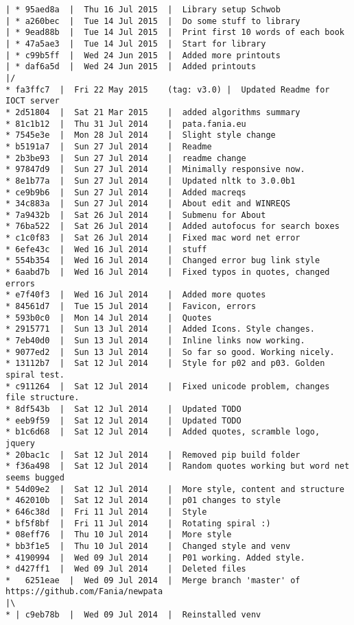 \begin{verbatim}
| * 95aed8a  |  Thu 16 Jul 2015	 |  Library setup Schwob
| * a260bec  |  Tue 14 Jul 2015	 |  Do some stuff to library
| * 9ead88b  |  Tue 14 Jul 2015	 |  Print first 10 words of each book
| * 47a5ae3  |  Tue 14 Jul 2015	 |  Start for library
| * c99b5ff  |  Wed 24 Jun 2015	 |  Added more printouts
| * daf6a5d  |  Wed 24 Jun 2015	 |  Added printouts
|/  
* fa3ffc7  |  Fri 22 May 2015	 (tag: v3.0) |  Updated Readme for IOCT server
* 2d51804  |  Sat 21 Mar 2015	 |  added algorithms summary
* 81c1b12  |  Thu 31 Jul 2014	 |  pata.fania.eu
* 7545e3e  |  Mon 28 Jul 2014	 |  Slight style change
* b5191a7  |  Sun 27 Jul 2014	 |  Readme
* 2b3be93  |  Sun 27 Jul 2014	 |  readme change
* 97847d9  |  Sun 27 Jul 2014	 |  Minimally responsive now.
* 8e1b77a  |  Sun 27 Jul 2014	 |  Updated nltk to 3.0.0b1
* ce9b9b6  |  Sun 27 Jul 2014	 |  Added macreqs
* 34c883a  |  Sun 27 Jul 2014	 |  About edit and WINREQS
* 7a9432b  |  Sat 26 Jul 2014	 |  Submenu for About
* 76ba522  |  Sat 26 Jul 2014	 |  Added autofocus for search boxes
* c1c0f83  |  Sat 26 Jul 2014	 |  Fixed mac word net error
* 6efe43c  |  Wed 16 Jul 2014	 |  stuff
* 554b354  |  Wed 16 Jul 2014	 |  Changed error bug link style
* 6aabd7b  |  Wed 16 Jul 2014	 |  Fixed typos in quotes, changed errors
* e7f40f3  |  Wed 16 Jul 2014	 |  Added more quotes
* 84561d7  |  Tue 15 Jul 2014	 |  Favicon, errors
* 593b0c0  |  Mon 14 Jul 2014	 |  Quotes
* 2915771  |  Sun 13 Jul 2014	 |  Added Icons. Style changes.
* 7eb40d0  |  Sun 13 Jul 2014	 |  Inline links now working.
* 9077ed2  |  Sun 13 Jul 2014	 |  So far so good. Working nicely.
* 13112b7  |  Sat 12 Jul 2014	 |  Style for p02 and p03. Golden spiral test.
* c911264  |  Sat 12 Jul 2014	 |  Fixed unicode problem, changes file structure.
* 8df543b  |  Sat 12 Jul 2014	 |  Updated TODO
* eeb9f59  |  Sat 12 Jul 2014	 |  Updated TODO
* b1c6d68  |  Sat 12 Jul 2014	 |  Added quotes, scramble logo, jquery
* 20bac1c  |  Sat 12 Jul 2014	 |  Removed pip build folder
* f36a498  |  Sat 12 Jul 2014	 |  Random quotes working but word net seems bugged
* 54d09e2  |  Sat 12 Jul 2014	 |  More style, content and structure
* 462010b  |  Sat 12 Jul 2014	 |  p01 changes to style
* 646c38d  |  Fri 11 Jul 2014	 |  Style
* bf5f8bf  |  Fri 11 Jul 2014	 |  Rotating spiral :)
* 08eff76  |  Thu 10 Jul 2014	 |  More style
* bb3f1e5  |  Thu 10 Jul 2014	 |  Changed style and venv
* 4190994  |  Wed 09 Jul 2014	 |  P01 working. Added style.
* d427ff1  |  Wed 09 Jul 2014	 |  Deleted files
*   6251eae  |  Wed 09 Jul 2014	 |  Merge branch 'master' of https://github.com/Fania/newpata
|\  
* | c9eb78b  |  Wed 09 Jul 2014	 |  Reinstalled venv

\end{verbatim}
